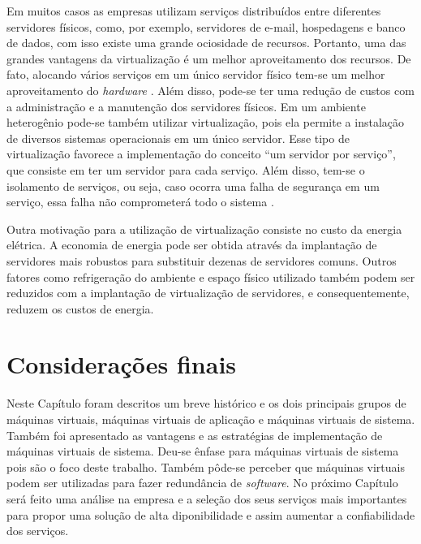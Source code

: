 Em muitos casos as empresas utilizam serviços distribuídos entre diferentes servidores físicos, como, por exemplo, servidores de e-mail, 
hospedagens e banco de dados, com isso existe uma grande ociosidade de recursos. Portanto, uma das grandes vantagens da virtualização é um melhor 
aproveitamento dos recursos. De fato, alocando vários serviços em um único servidor físico tem-se um melhor aproveitamento do \textit{hardware} 
\cite{moreira2006}. Além disso, pode-se ter uma redução de custos com a administração e a manutenção dos servidores físicos. Em um ambiente 
heterogênio pode-se também utilizar virtualização, pois ela permite a instalação de diversos sistemas operacionais em um único servidor.
Esse tipo de virtualização favorece a implementação do conceito ``um servidor por serviço'', que consiste em ter um servidor para cada 
serviço. Além disso, tem-se o isolamento de serviços, ou seja, caso ocorra uma falha de segurança em um serviço, essa falha não comprometerá 
todo o sistema \cite{carissimi2008}.

Outra motivação para a utilização de virtualização consiste no custo da energia elétrica. A economia de energia pode ser obtida 
através da implantação de servidores mais robustos para substituir dezenas de servidores comuns. Outros fatores como refrigeração do ambiente e 
espaço físico utilizado também podem ser reduzidos com a implantação de virtualização de servidores, e consequentemente, reduzem os 
custos de energia.

\section{Considerações finais}

Neste Capítulo foram descritos um breve histórico e os dois principais grupos de máquinas virtuais, máquinas virtuais de aplicação e máquinas 
virtuais de sistema. Também foi apresentado as vantagens e as estratégias de implementação de máquinas virtuais de sistema. Deu-se ênfase 
para máquinas virtuais de sistema pois são o foco deste trabalho. Também pôde-se perceber que máquinas virtuais podem ser utilizadas para fazer 
redundância de \textit{software}. No próximo Capítulo será feito uma análise na empresa e a seleção dos seus serviços mais importantes para 
propor uma solução de alta diponibilidade e assim aumentar a confiabilidade dos serviços.



